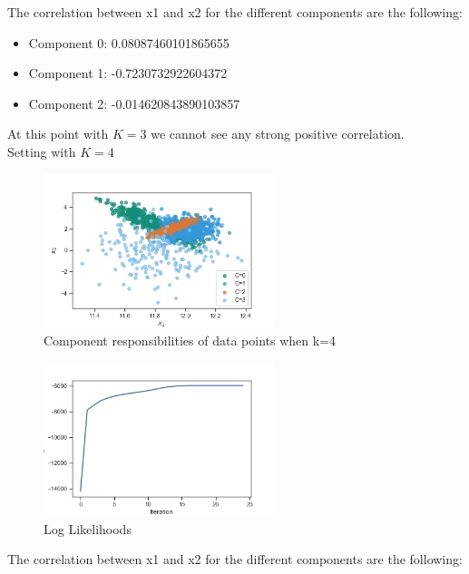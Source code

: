 \documentclass[a4paper]{article}
\begin{document}
The correlation between x1 and x2 for the different components are the following:

\begin{itemize}
	\item Component 0: 0.08087460101865655
	\item Component 1: -0.7230732922604372
	\item Component 2: -0.014620843890103857
\end{itemize}

At this point with $K = 3$ we cannot see any strong positive correlation.\\






Setting with $K=4$\\


\begin{figure}[H]
\center
\includegraphics[width=0.6\textwidth]{Images/figure_4_4_b_resp.png}
\caption{Component responsibilities of data points when k=4}
\label{Fig:4_4_b_responsibilities}
\end{figure}

\begin{figure}[H]
\center
\includegraphics[width=0.6\textwidth]{Images/figure_4_4_b_log_likelihoods.png}
\caption{Log Likelihoods}
\label{Fig:4_4_b_log_likelihoods}
\end{figure}

The correlation between x1 and x2 for the different components are the following:
\end{document}
